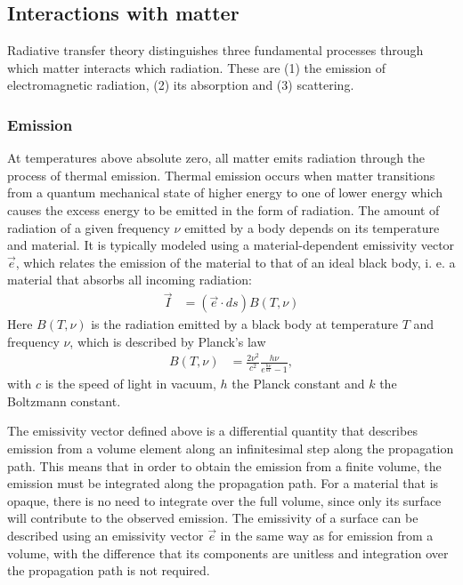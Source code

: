 \subsection{Interactions with matter}

Radiative transfer theory distinguishes three fundamental processes through
which matter interacts which radiation. These are (1) the emission of
electromagnetic radiation, (2) its absorption and (3) scattering.

\subsubsection{Emission}

At temperatures above absolute zero, all matter emits radiation through the
process of thermal emission. Thermal emission occurs when matter transitions
from a quantum mechanical state of higher energy to one of lower energy which
causes the excess energy to be emitted in the form of radiation. The amount of
radiation of a given frequency $\nu$ emitted by a body depends on its
temperature and material. It is typically modeled using a material-dependent
emissivity vector $\vec{e}$, which relates the emission of the material to that
of an ideal black body, i. e. a material that absorbs all incoming radiation:
 \begin{align}
   \label{eq:emissivity}
   \vec{I} &= (\vec{e} \cdot ds) B(T, \nu)
 \end{align}
 Here $B(T, \nu)$ is the radiation emitted by a black body at temperature $T$
 and frequency $\nu$, which is described by Planck's law
 \begin{align}
   B(T, \nu) &= \frac{2 \nu^2}{c^2}\frac{h\nu}{e^{\frac{h\nu}{k T}} - 1},
 \end{align}
 with $c$ is the speed of light in vacuum, $h$  the Planck constant and $k$
 the Boltzmann constant.

The emissivity vector defined above is a differential quantity that describes
emission from a volume element along an infinitesimal step along the propagation
path. This means that in order to obtain the emission from a finite volume, the
emission must be integrated along the propagation path. For a material that is
opaque, there is no need to integrate over the full volume, since only its
surface will contribute to the observed emission. The emissivity of a surface
can be described using an emissivity vector $\vec{e}$ in the same way as for
emission from a volume, with the difference that its components are unitless
and integration over the propagation path is not required.

